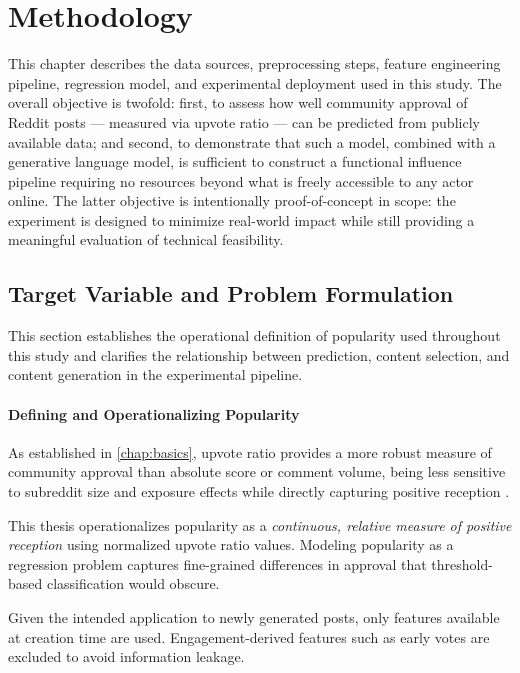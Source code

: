 \chapter{Methodology}
\label{chap:methodology}

This chapter describes the data sources, preprocessing steps, feature engineering pipeline, regression model, and experimental deployment used in this study. The overall objective is twofold: first, to assess how well community approval of Reddit posts — measured via upvote ratio — can be predicted from publicly available data; and second, to demonstrate that such a model, combined with a generative language model, is sufficient to construct a functional influence pipeline requiring no resources beyond what is freely accessible to any actor online. The latter objective is intentionally proof-of-concept in scope: the experiment is designed to minimize real-world impact while still providing a meaningful evaluation of technical feasibility.

\section{Target Variable and Problem Formulation}
\label{sec:target_formulation}

This section establishes the operational definition of popularity used throughout this study and clarifies the relationship between prediction, content selection, and content generation in the experimental pipeline.

\subsubsection*{Defining and Operationalizing Popularity}
\label{subsec:defining_popularity}

As established in \autoref{chap:basics}, upvote ratio provides a more robust measure of community approval than absolute score or comment volume, being less sensitive to subreddit size and exposure effects while directly capturing positive reception \cite{hessel2019something,stoddard2015popularity}. 

This thesis operationalizes popularity as a \emph{continuous, relative measure of positive reception} using normalized upvote ratio values. Modeling popularity as a regression problem captures fine-grained differences in approval that threshold-based classification would obscure.

Given the intended application to newly generated posts, only features available at creation time are used. Engagement-derived features such as early votes \cite{terentiev2014predicting,wigsnes2019predicting} are excluded to avoid information leakage.

